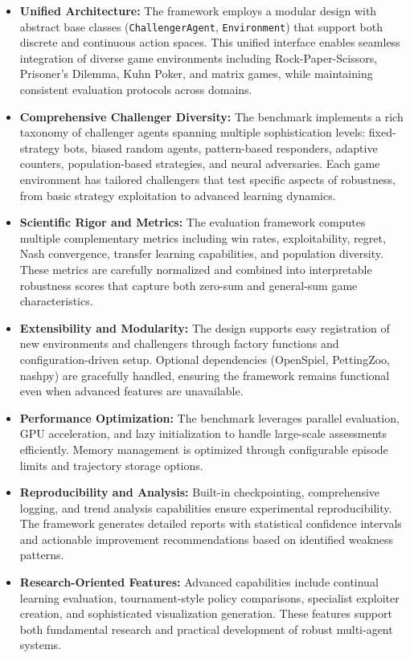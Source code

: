 \documentclass[sigconf,anonymous]{aamas}
\begin{document}
\begin{itemize}
    \item \textbf{Unified Architecture:} The framework employs a modular design with abstract base classes (\texttt{ChallengerAgent}, \texttt{Environment}) that support both discrete and continuous action spaces. This unified interface enables seamless integration of diverse game environments including Rock-Paper-Scissors, Prisoner's Dilemma, Kuhn Poker, and matrix games, while maintaining consistent evaluation protocols across domains.

    \item \textbf{Comprehensive Challenger Diversity:} The benchmark implements a rich taxonomy of challenger agents spanning multiple sophistication levels: fixed-strategy bots, biased random agents, pattern-based responders, adaptive counters, population-based strategies, and neural adversaries. Each game environment has tailored challengers that test specific aspects of robustness, from basic strategy exploitation to advanced learning dynamics.

    \item \textbf{Scientific Rigor and Metrics:} The evaluation framework computes multiple complementary metrics including win rates, exploitability, regret, Nash convergence, transfer learning capabilities, and population diversity. These metrics are carefully normalized and combined into interpretable robustness scores that capture both zero-sum and general-sum game characteristics.

    \item \textbf{Extensibility and Modularity:} The design supports easy registration of new environments and challengers through factory functions and configuration-driven setup. Optional dependencies (OpenSpiel, PettingZoo, nashpy) are gracefully handled, ensuring the framework remains functional even when advanced features are unavailable.

    \item \textbf{Performance Optimization:} The benchmark leverages parallel evaluation, GPU acceleration, and lazy initialization to handle large-scale assessments efficiently. Memory management is optimized through configurable episode limits and trajectory storage options.

    \item \textbf{Reproducibility and Analysis:} Built-in checkpointing, comprehensive logging, and trend analysis capabilities ensure experimental reproducibility. The framework generates detailed reports with statistical confidence intervals and actionable improvement recommendations based on identified weakness patterns.

    \item \textbf{Research-Oriented Features:} Advanced capabilities include continual learning evaluation, tournament-style policy comparisons, specialist exploiter creation, and sophisticated visualization generation. These features support both fundamental research and practical development of robust multi-agent systems.
\end{itemize}
\end{document}
